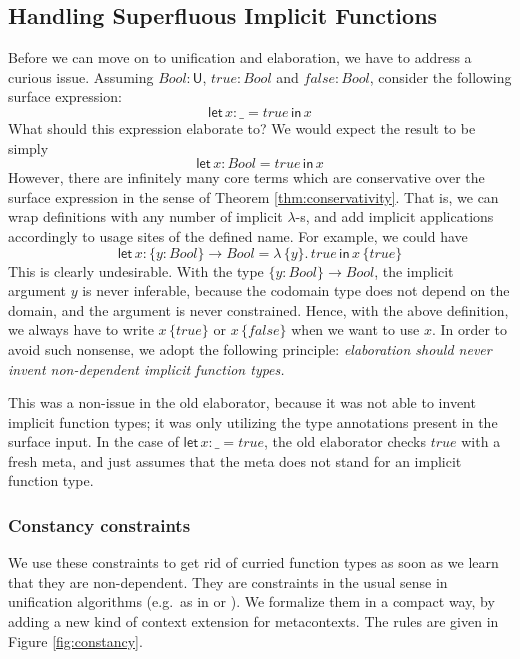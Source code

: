 \documentclass[acmsmall,review,anonymous,prologue,dvipsnames]{acmart}\settopmatter{printfolios=true,printccs=false,printacmref=false}
\newcommand{\slet}{\boldsymbol{\mathsf{let}}}
\renewcommand{\sin}{\boldsymbol{\mathsf{in}}}
\renewcommand{\U}{\mathsf{U}}
\theoremstyle{remark}
\begin{document}
\subsection{Handling Superfluous Implicit Functions}\label{sec:superfluous}

Before we can move on to unification and elaboration, we have to address
a curious issue. Assuming $Bool : \U$, $true : Bool$ and $false : Bool$,
consider the following surface expression:
\[
  \slet\,x : \_ = true\,\sin\,x
\]
What should this expression elaborate to? We would expect the result to be simply
\[
  \slet\,x : Bool = true\,\sin\,x
\]
However, there are infinitely many core terms which are conservative over the
surface expression in the sense of Theorem \ref{thm:conservativity}. That is, we
can wrap definitions with any number of implicit $\lambda$-s, and add implicit
applications accordingly to usage sites of the defined name. For example, we could have
\[
  \slet\,x : \{y : Bool\} \to Bool = \lambda\,\{y\}.\,true\,\sin\,x\,\{true\}
\]
This is clearly undesirable. With the type $\{y : Bool\} \to Bool$, the implicit
argument $y$ is never inferable, because the codomain type does not depend on
the domain, and the argument is never constrained. Hence, with the above
definition, we always have to write $x\,\{true\}$ or $x\,\{false\}$ when we want
to use $x$. In order to avoid such nonsense, we adopt the following principle:
\emph{elaboration should never invent non-dependent implicit function types.}

This was a non-issue in the old elaborator, because it was not able to invent
implicit function types; it was only utilizing the type annotations present in
the surface input. In the case of $\slet\,x : \_ = true$, the old elaborator
checks $true$ with a fresh meta, and just assumes that the meta does not stand
for an implicit function type.

\subsubsection{Constancy constraints}
We use these constraints to get rid of curried function types as soon as we
learn that they are non-dependent. They are constraints in the usual sense in
unification algorithms (e.g.\ as in \cite{abel2011higher} or
\cite{vytiniotis2011outsidein}). We formalize them in a compact way, by adding a
new kind of context extension for metacontexts. The rules are given in Figure
\ref{fig:constancy}.
\end{document}
